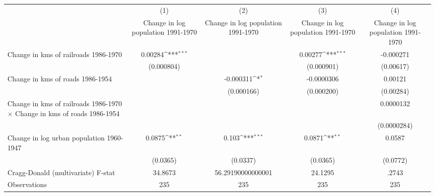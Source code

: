 {
\def\sym#1{\ifmmode^{#1}\else\(^{#1}\)\fi}
\begin{tabular}{l*{4}{c}}
\hline\hline
                &\multicolumn{1}{c}{(1)}&\multicolumn{1}{c}{(2)}&\multicolumn{1}{c}{(3)}&\multicolumn{1}{c}{(4)}\\
                &\multicolumn{1}{c}{Change in log population 1991-1970}&\multicolumn{1}{c}{Change in log population 1991-1970}&\multicolumn{1}{c}{Change in log population 1991-1970}&\multicolumn{1}{c}{Change in log population 1991-1970}\\
\hline
Change in kms of railroads 1986-1970&  0.00284\sym{***}&                  &  0.00277\sym{***}&-0.000271         \\
                &(0.000804)         &                  &(0.000901)         &(0.00617)         \\
[1em]
Change in kms of roads 1986-1954&                  &-0.000311\sym{*}  &-0.0000306         &  0.00121         \\
                &                  &(0.000166)         &(0.000200)         &(0.00284)         \\
[1em]
Change in kms of railroads 1986-1970 $\times$ Change in kms of roads 1986-1954&                  &                  &                  &0.0000132         \\
                &                  &                  &                  &(0.0000284)         \\
[1em]
Change in log urban population 1960-1947&   0.0875\sym{**} &    0.103\sym{***}&   0.0871\sym{**} &   0.0587         \\
                & (0.0365)         & (0.0337)         & (0.0365)         & (0.0772)         \\
\hline
Cragg-Donald (multivariate) F-stat&  34.8673         &56.29190000000001         &  24.1295         &    .2743         \\
Observations    &      235         &      235         &      235         &      235         \\
\hline\hline
\end{tabular}
}
